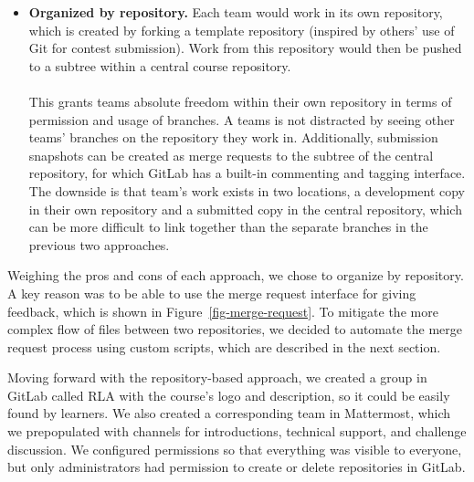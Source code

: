 \documentclass[12pt,twoside]{mitthesis}
\begin{document}
{\begin{itemize}
The drawback of this method is the disparity between such use of branches and what branches are typically used for. Branches are usually for work-in-progress features or experiments with the intention of eventually merging the branch back. However, here they would be used by teams pursuing totally separate projects in the same place on different branches, which wouldn't make sense to eventually merge. This disparity would potentially confuse users previously familiar with Git and teach improper skills for those who go on to use Git beyond the course.
\item \textbf{Organized by repository.} Each team would work in its own repository, which is created by forking a template repository (inspired by others' use of Git for contest submission). Work from this repository would then be pushed to a subtree within a central course repository.\\ \\
This grants teams absolute freedom within their own repository in terms of permission and usage of branches. A teams is not distracted by seeing other teams' branches on the repository they work in. Additionally, submission snapshots can be created as merge requests to the subtree of the central repository, for which GitLab has a built-in commenting and tagging interface. The downside is that team's work exists in two locations, a development copy in their own repository and a submitted copy in the central repository, which can be more difficult to link together than the separate branches in the previous two approaches.
\end{itemize}
Weighing the pros and cons of each approach, we chose to organize by repository. A key reason was to be able to use the merge request interface for giving feedback, which is shown in Figure~\ref{fig-merge-request}. To mitigate the more complex flow of files between two repositories, we decided to automate the merge request process using custom scripts, which are described in the next section.

Moving forward with the repository-based approach, we created a group in GitLab called RLA with the course's logo and description, so it could be easily found by learners. We also created a corresponding team in Mattermost, which we prepopulated with channels for introductions, technical support, and challenge discussion. We configured permissions so that everything was visible to everyone, but only administrators had permission to create or delete repositories in GitLab.

}
\end{document}
